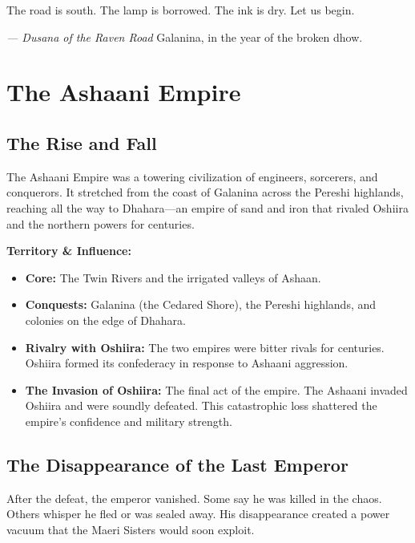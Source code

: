 \documentclass[11pt,twoside]{book}
\begin{document}
The road is south. The lamp is borrowed. The ink is dry. Let us begin.

\noindent\textit{--- Dusana of the Raven Road}
\newline Galanina, in the year of the broken dhow.

\tableofcontents

\mainmatter


\chapter{The Ashaani Empire}

\section{The Rise and Fall}

The Ashaani Empire was a towering civilization of engineers, sorcerers, and conquerors. It stretched from the coast of Galanina across the Pereshi highlands, reaching all the way to Dhahara---an empire of sand and iron that rivaled Oshiira and the northern powers for centuries.

\textbf{Territory \& Influence:}
\begin{itemize}
    \item \textbf{Core:} The Twin Rivers and the irrigated valleys of Ashaan.
    \item \textbf{Conquests:} Galanina (the Cedared Shore), the Pereshi highlands, and colonies on the edge of Dhahara.
    \item \textbf{Rivalry with Oshiira:} The two empires were bitter rivals for centuries. Oshiira formed its confederacy in response to Ashaani aggression.
    \item \textbf{The Invasion of Oshiira:} The final act of the empire. The Ashaani invaded Oshiira and were soundly defeated. This catastrophic loss shattered the empire's confidence and military strength.
\end{itemize}

\section{The Disappearance of the Last Emperor}

After the defeat, the emperor vanished. Some say he was killed in the chaos. Others whisper he fled or was sealed away. His disappearance created a power vacuum that the Maeri Sisters would soon exploit.
\end{document}
